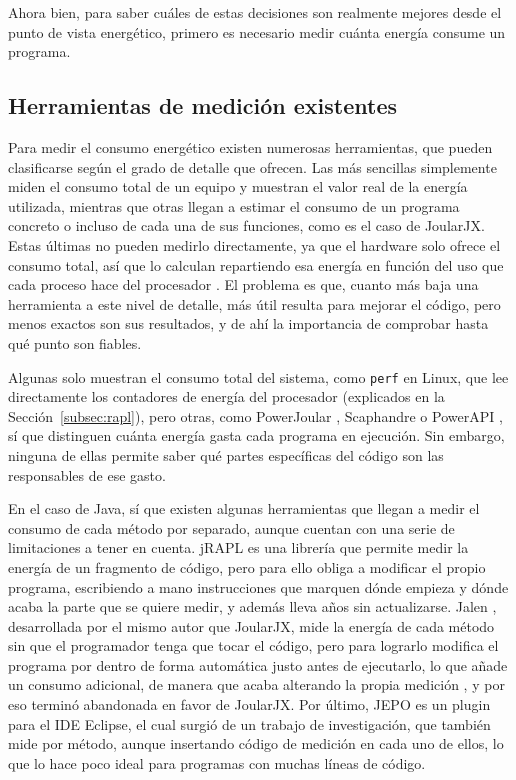 Ahora bien, para saber cuáles de estas decisiones son realmente mejores desde el punto de vista energético, primero es necesario medir cuánta energía consume un programa.

\subsection{Herramientas de medición existentes}
\label{subsec:herramientas-medicion}

Para medir el consumo energético existen numerosas herramientas, que pueden
clasificarse según el grado de detalle que ofrecen. Las más sencillas simplemente miden el consumo total de un equipo y muestran el valor real de la energía utilizada, mientras que
otras llegan a estimar el consumo de un programa concreto o incluso de cada una
de sus funciones, como es el caso de JoularJX. Estas últimas no pueden medirlo
directamente, ya que el hardware solo ofrece el consumo total, así que lo
calculan repartiendo esa energía en función del uso que cada proceso hace del procesador \cite{joularjx2022, joularjxrepo}. El problema es que, cuanto más baja una herramienta a este nivel de detalle, más útil resulta para mejorar el código, pero menos exactos son sus resultados, y de ahí la importancia de comprobar hasta qué punto son fiables.

Algunas solo
muestran el consumo total del sistema, como \texttt{perf} en Linux, que lee
directamente los contadores de energía del procesador (explicados en la
Sección~\ref{subsec:rapl}), pero otras, como PowerJoular \cite{joularjx2022}, Scaphandre
\cite{scaphandre} o PowerAPI \cite{fieni2024powerapi}, sí que distinguen cuánta energía gasta cada
programa en ejecución. Sin embargo, ninguna de
ellas permite saber qué partes específicas del código son las responsables de ese
gasto.

En el caso de Java, sí que existen algunas herramientas que llegan a medir el consumo de cada método por separado, aunque cuentan con una serie de limitaciones a tener en cuenta. jRAPL \cite{liu2015jrapl} es una librería que permite medir la energía de un fragmento de código, pero para ello obliga a modificar el propio programa, escribiendo a mano instrucciones que marquen dónde empieza y dónde acaba la parte que se quiere medir, y además lleva años sin actualizarse. Jalen \cite{noureddine2015hotspots}, desarrollada por el mismo autor que JoularJX, mide la energía de cada método sin que el programador tenga que tocar el código, pero para lograrlo modifica el programa por dentro de forma automática justo antes de ejecutarlo, lo que añade un consumo adicional, de manera que acaba alterando la propia medición \cite{noureddine2013review}, y por eso terminó abandonada en favor de JoularJX. Por último, JEPO \cite{kumar2019jepo} es un plugin para el IDE Eclipse, el cual surgió de un trabajo de investigación, que también mide por método, aunque insertando código de medición en cada uno de ellos, lo que lo hace poco ideal para programas con muchas líneas de código.


